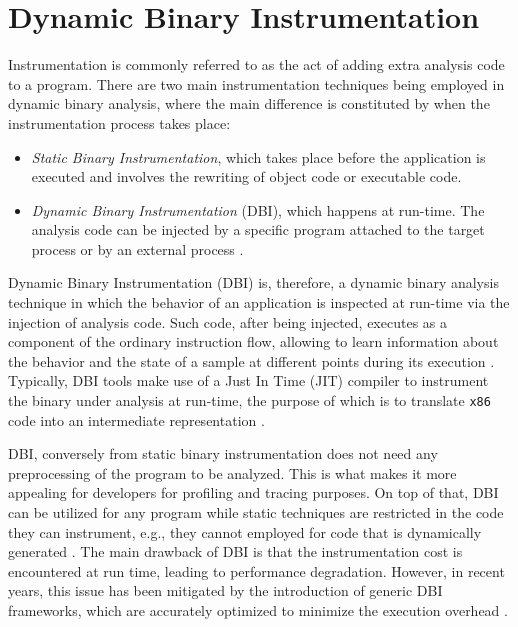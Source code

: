 \section{Dynamic Binary Instrumentation} \label{DBI}

Instrumentation is commonly referred to as the act of adding extra analysis code to a program. There are two main instrumentation techniques being employed in dynamic binary analysis, where the main difference is constituted by when the instrumentation process takes place:

\begin{itemize}
\item \textit{Static Binary Instrumentation}, which takes place before the application is executed and involves the rewriting of object code or executable code.
\item \textit{Dynamic Binary Instrumentation} (DBI), 	which happens at run-time. The analysis code can be injected by a specific program attached to the target process or by an external process \cite{Nethercote2004CI}. 
\end{itemize}   

Dynamic Binary Instrumentation (DBI) is, therefore, a dynamic binary analysis technique in which the behavior of an application is inspected at run-time via the injection of analysis code. Such code, after being injected, executes as a component of the ordinary instruction flow, allowing to learn information about the behavior and the state of a sample at different points during its execution \cite{DBI}. Typically, DBI tools make use of a Just In Time (JIT) compiler to instrument the binary under analysis at run-time, the purpose of which is to translate \texttt{x86} code into an intermediate representation \cite{polino_arancino_2017}.

DBI, conversely from static binary instrumentation does not need any preprocessing of the program to be analyzed. This is what makes it more appealing for developers for profiling and tracing purposes. On top of that, DBI can be utilized for any program while static techniques are restricted in the code they can instrument, e.g., they cannot employed for code that is dynamically generated \cite{6658603}. The main drawback of DBI is that the instrumentation cost is encountered at run time, leading to performance degradation. However, in recent years, this issue has been mitigated by the introduction of generic DBI frameworks, which are accurately optimized to minimize the execution overhead \cite{Nethercote2004CI}.

